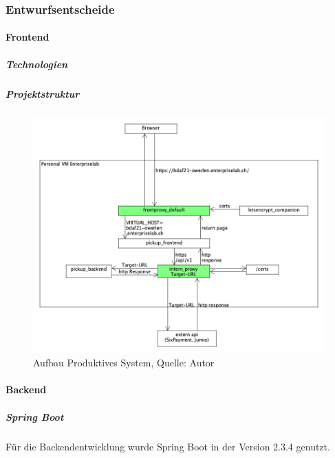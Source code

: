 \subsubsection{Entwurfsentscheide}
\paragraph{Frontend}
\subparagraph{Technologien}
\subparagraph{Projektstruktur}
\begin{figure}[H]
	\centering
	\includegraphics[width=1\textwidth]{images/requestHandling.png}
	\caption[Aufbau Produktives System]{Aufbau Produktives System, Quelle: Autor}
	\label{img: prodSystem}
\end{figure}
\paragraph{Backend}
\subparagraph{Spring Boot}
Für die Backendentwicklung wurde Spring Boot in der Version 2.3.4 genutzt.

